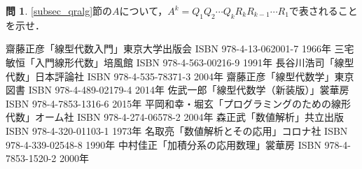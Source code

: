 \documentclass[dvipdfmx]{jsarticle}
\theoremstyle{definition}
\newtheorem{question}{問}[section]
\begin{document}
\begin{question}
    \label{q_powdec}
    \ref{subsec_qralg}節の$A$について，$A^k = Q_1 Q_2 \cdots Q_k R_k R_{k-1} \cdots R_1$で表されることを示せ．
\end{question}



\begin{thebibliography}{9}
     齋藤正彦「線型代数入門」東京大学出版会 ISBN 978-4-13-062001-7 1966年
     三宅敏恒「入門線形代数」培風館 ISBN 978-4-563-00216-9 1991年
     長谷川浩司「線型代数」日本評論社 ISBN 978-4-535-78371-3 2004年
     齋藤正彦「線型代数学」東京図書 ISBN 978-4-489-02179-4 2014年
     佐武一郎「線型代数学（新装版）」裳華房 ISBN 978-4-7853-1316-6 2015年
     平岡和幸・堀玄「プログラミングのための線形代数」オーム社 ISBN 978-4-274-06578-2 2004年
     森正武「数値解析」共立出版 ISBN 978-4-320-01103-1 1973年
     名取亮「数値解析とその応用」コロナ社 ISBN 978-4-339-02548-8 1990年
     中村佳正「加積分系の応用数理」裳華房 ISBN 978-4-7853-1520-2 2000年
\end{thebibliography}
\end{document}
